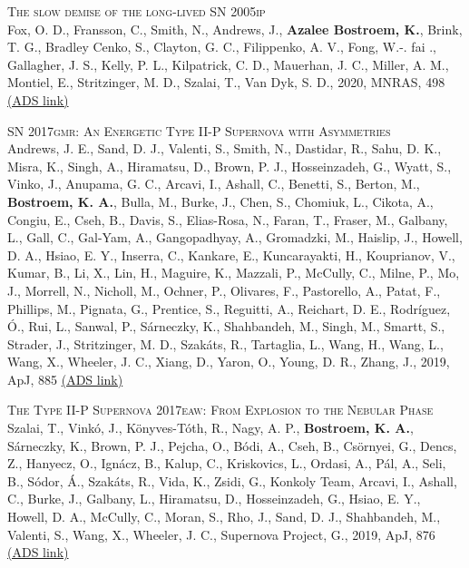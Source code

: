 \begin{revnumerate}[67]
    \item{\textsc{The slow demise of the long-lived SN 2005ip}\\ 
    Fox, O. D., Fransson, C., Smith, N., Andrews, J., \textbf{Azalee Bostroem, K.}, Brink, T. G., Bradley Cenko, S., Clayton, G. C., Filippenko, A. V., Fong, W.-. fai ., Gallagher, J. S., Kelly, P. L., Kilpatrick, C. D., Mauerhan, J. C., Miller, A. M., Montiel, E., Stritzinger, M. D., Szalai, T., Van Dyk, S. D., 2020, MNRAS, 498 
    \color{blue}\href{https://ui.adsabs.harvard.edu/abs/2020MNRAS.498..517F}{(ADS link)}\color{black}}\\
 
    
    \item{\textsc{SN 2017gmr: An Energetic Type II-P Supernova with Asymmetries}\\ 
    Andrews, J. E., Sand, D. J., Valenti, S., Smith, N., Dastidar, R., Sahu, D. K., Misra, K., Singh, A., Hiramatsu, D., Brown, P. J., Hosseinzadeh, G., Wyatt, S., Vinko, J., Anupama, G. C., Arcavi, I., Ashall, C., Benetti, S., Berton, M., \textbf{Bostroem, K. A.}, Bulla, M., Burke, J., Chen, S., Chomiuk, L., Cikota, A., Congiu, E., Cseh, B., Davis, S., Elias-Rosa, N., Faran, T., Fraser, M., Galbany, L., Gall, C., Gal-Yam, A., Gangopadhyay, A., Gromadzki, M., Haislip, J., Howell, D. A., Hsiao, E. Y., Inserra, C., Kankare, E., Kuncarayakti, H., Kouprianov, V., Kumar, B., Li, X., Lin, H., Maguire, K., Mazzali, P., McCully, C., Milne, P., Mo, J., Morrell, N., Nicholl, M., Ochner, P., Olivares, F., Pastorello, A., Patat, F., Phillips, M., Pignata, G., Prentice, S., Reguitti, A., Reichart, D. E., Rodríguez, Ó., Rui, L., Sanwal, P., Sárneczky, K., Shahbandeh, M., Singh, M., Smartt, S., Strader, J., Stritzinger, M. D., Szakáts, R., Tartaglia, L., Wang, H., Wang, L., Wang, X., Wheeler, J. C., Xiang, D., Yaron, O., Young, D. R., Zhang, J., 2019, ApJ, 885 
    \color{blue}\href{https://ui.adsabs.harvard.edu/abs/2019ApJ...885...43A}{(ADS link)}\color{black}}\\
   
    
    \item{\textsc{The Type II-P Supernova 2017eaw: From Explosion to the Nebular Phase}\\ 
    Szalai, T., Vinkó, J., Könyves-T\'{o}th, R., Nagy, A. P., \textbf{Bostroem, K. A.}, S\'{a}rneczky, K., Brown, P. J., Pejcha, O., Bódi, A., Cseh, B., Csörnyei, G., Dencs, Z., Hanyecz, O., Ign\'{a}cz, B., Kalup, C., Kriskovics, L., Ordasi, A., Pál, A., Seli, B., S\'{o}dor, \'{A}., Szak\'{a}ts, R., Vida, K., Zsidi, G., Konkoly Team, Arcavi, I., Ashall, C., Burke, J., Galbany, L., Hiramatsu, D., Hosseinzadeh, G., Hsiao, E. Y., Howell, D. A., McCully, C., Moran, S., Rho, J., Sand, D. J., Shahbandeh, M., Valenti, S., Wang, X., Wheeler, J. C., Supernova Project, G., 2019, ApJ, 876 
    \color{blue}\href{https://ui.adsabs.harvard.edu/abs/2019ApJ...876...19S}{(ADS link)}\color{black}}\\
    

\end{revnumerate}

